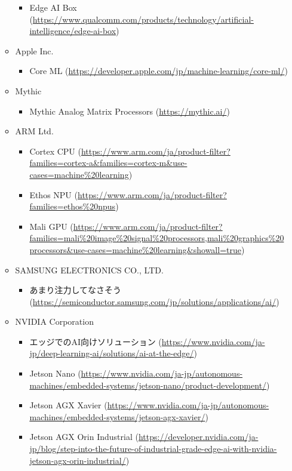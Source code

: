 \begin{itemize}
\begin{itemize}
\begin{itemize}
			\item Edge AI Box (\url{https://www.qualcomm.com/products/technology/artificial-intelligence/edge-ai-box})
		\end{itemize}
		\item Apple Inc.
		\begin{itemize}
			\item Core ML (\url{https://developer.apple.com/jp/machine-learning/core-ml/})
		\end{itemize}
		\item Mythic
		\begin{itemize}
			\item Mythic Analog Matrix Processors (\url{https://mythic.ai/})
		\end{itemize}
		\item ARM Ltd.
		\begin{itemize}
			\item Cortex CPU (\url{https://www.arm.com/ja/product-filter?families=cortex-a&families=cortex-m&use-cases=machine%20learning})
			\item Ethos NPU (\url{https://www.arm.com/ja/product-filter?families=ethos%20npus})
			\item Mali GPU (\url{https://www.arm.com/ja/product-filter?families=mali%20image%20signal%20processors,mali%20graphics%20processors&use-cases=machine%20learning&showall=true})
		\end{itemize}
		\item SAMSUNG ELECTRONICS CO., LTD.
		\begin{itemize}
			\item あまり注力してなさそう (\url{https://semiconductor.samsung.com/jp/solutions/applications/ai/})
		\end{itemize}
		\item NVIDIA Corporation
		\begin{itemize}
			\item エッジでのAI向けソリューション (\url{https://www.nvidia.com/ja-jp/deep-learning-ai/solutions/ai-at-the-edge/})
			\item Jetson Nano (\url{https://www.nvidia.com/ja-jp/autonomous-machines/embedded-systems/jetson-nano/product-development/})
			\item Jetson AGX Xavier (\url{https://www.nvidia.com/ja-jp/autonomous-machines/embedded-systems/jetson-agx-xavier/})
			\item Jetson AGX Orin Industrial (\url{https://developer.nvidia.com/ja-jp/blog/step-into-the-future-of-industrial-grade-edge-ai-with-nvidia-jetson-agx-orin-industrial/})

\end{itemize}
\end{itemize}
\end{itemize}
